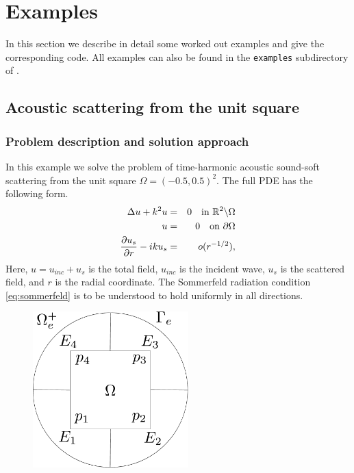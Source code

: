 \section{Examples}
In this section we describe in detail some worked out examples and
give the corresponding code. All examples can also be found in the
{\texttt{examples}} subdirectory of \mpspack.

\subsection{Acoustic scattering from the unit square}

\subsubsection{Problem description and solution approach}

In this example we solve the problem of time-harmonic 
acoustic sound-soft scattering from the unit square $\Omega=(-0.5,0.5)^2$.
The full PDE has the following form.
\begin{eqnarray}
\Delta u+k^2u & = & 0  \quad \text{in
}\mathbb{R}^2\backslash\Omega\label{eq:helm}\\
u&=&0 \quad \text{on } {\partial\Omega} \label{eq:soundsoft}\\
\frac{\partial u_s}{\partial r}-iku_s & = & o(r^{-1/2}),\label{eq:sommerfeld}
\end{eqnarray}
Here, $u=u_{inc}+u_s$ is the total field, $u_{inc}$ is the incident
wave, $u_s$ is the scattered field, and $r$ is the radial coordinate.
The Sommerfeld radiation condition
\eqref{eq:sommerfeld} is to be understood to hold uniformly in all
directions. 

\begin{figure}
\center
\includegraphics[width=6cm]{geometry}
\vspace{-.5cm}
\label{fig:geom}
\end{figure}


